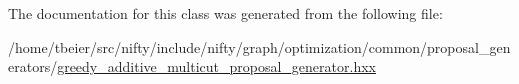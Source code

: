 The documentation for this class was generated from the following file\+:\begin{DoxyCompactItemize}
\item 
/home/tbeier/src/nifty/include/nifty/graph/optimization/common/proposal\+\_\+generators/\hyperlink{greedy__additive__multicut__proposal__generator_8hxx}{greedy\+\_\+additive\+\_\+multicut\+\_\+proposal\+\_\+generator.\+hxx}\end{DoxyCompactItemize}
